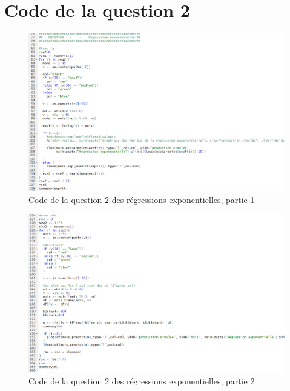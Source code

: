 \documentclass[12pt]{article}
\begin{document}
\section{Code de la question 2}
\begin{figure}[H]
 \centering %
	\includegraphics[width=600px]{code_q2_1}
  \caption{\label{fig:code_q2_1} Code de la question 2 des r\'egressions exponentielles, partie 1}
\end{figure}
\begin{figure}[H]
 \centering %
	\includegraphics[width=600px]{code_q2_2}
  \caption{\label{fig:code_q2_2} Code de la question 2 des r\'egressions exponentielles, partie 2}
\end{figure}
\end{document}
